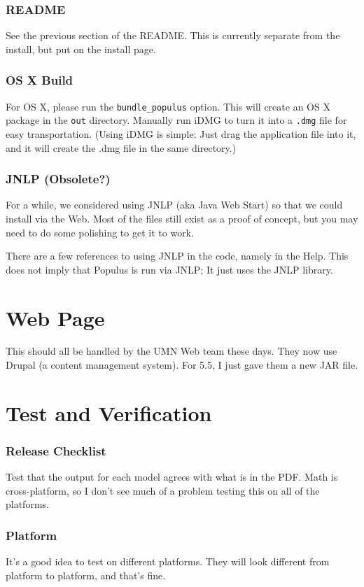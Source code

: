 \documentclass[12pt]{article}
\begin{document}
\section{README}
See the previous section of the README.  This is currently separate from the install, but put on the install page.

\section{OS X Build}
For OS X, please run the \texttt{bundle\_populus} option.  This will create an OS X package in the \texttt{out} directory.  Manually run iDMG to turn it into a \texttt{.dmg} file for easy transportation.  (Using iDMG is simple: Just drag the application file into it, and it will create the .dmg file in the same directory.)

\section{JNLP (Obsolete?)}
For a while, we considered using JNLP (aka Java Web Start) so that we could install via the Web.  Most of the files still exist as a proof of concept, but you may need to do some polishing to get it to work.

There are a few references to using JNLP in the code, namely in the Help.  This does not imply that Populus is run via JNLP;  It just uses the JNLP library.

\part{Web Page}

This should all be handled by the UMN Web team these days. They now use Drupal (a content management system).  For 5.5, I just gave them a new JAR file.

\part{Test and Verification}
\section{Release Checklist}

Test that the output for each model agrees with what is in the PDF.  Math is cross-platform, so I don't see much of a problem testing this on all of the platforms.

\section{Platform}
It's a good idea to test on different platforms.  They will look different from platform to platform, and that's fine.
\end{document}
